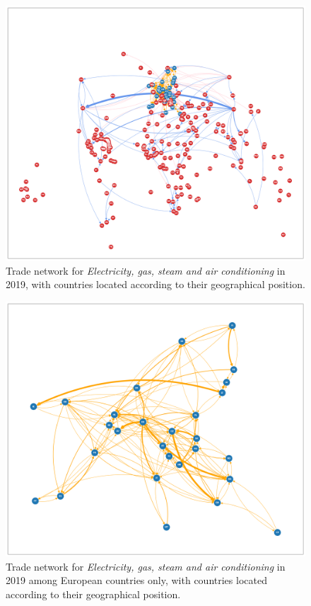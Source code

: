 \begin{figure}
    \includegraphics[width=\textwidth]{pics/full_y19_p35_force_79.png}
    \caption[Trade network for \textit{Electricity, gas, steam and air conditioning} in 2019]{Trade network for \textit{Electricity, gas, steam and air conditioning} in 2019, with countries located according to their geographical position.}
    \label{fig:elecgeo}
\end{figure}

\begin{figure}
    \includegraphics[width=\textwidth]{pics/full_y19_p35_force_82.png}
    \caption[Trade network for \textit{Electricity, gas, steam and air conditioning} in 2019 among European countries only.]{Trade network for \textit{Electricity, gas, steam and air conditioning} in 2019 among European countries only, with countries located according to their geographical position.}
    \label{fig:elecgeoeur}
\end{figure}

